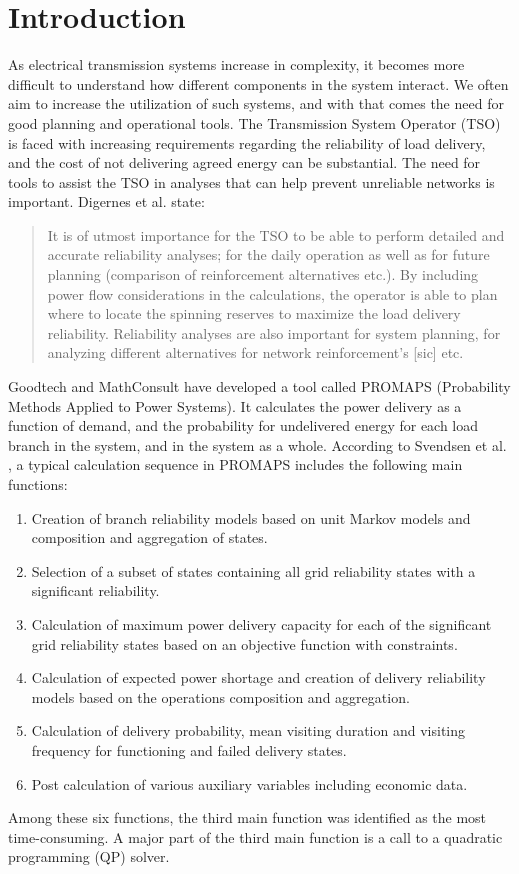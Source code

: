 \documentclass[a4paper,12pt]{report}
\begin{document}
\chapter{Introduction}
\label{ch:intro}
As electrical transmission systems increase in complexity, it becomes
more difficult to understand how different components in the system interact.
We often aim to increase the utilization of such systems, and with that comes
the need for good planning and operational tools.
The Transmission System Operator (TSO) is faced
with increasing requirements regarding the reliability of load
delivery, and the cost of not delivering agreed energy can be
substantial.
The need for tools to assist the TSO in analyses that can help prevent
unreliable networks is important.
Digernes et al. \cite{digernes} state:
\begin{quote}
It is of utmost importance for the TSO to be able to perform detailed and
accurate reliability analyses; for the daily operation as well as for
future planning (comparison of reinforcement alternatives etc.). By
including power flow considerations in the calculations, the operator is
able to plan where to locate the spinning reserves to maximize the load
delivery reliability. Reliability analyses are also important for system
planning, for analyzing different alternatives for network reinforcement's
[sic] etc.\cite{digernes}
\end{quote}

Goodtech and MathConsult have developed a tool called PROMAPS
(Probability Methods Applied to Power Systems). It calculates the power
delivery as a function of demand, and the probability for undelivered
energy for each load branch in the system, and in the system as a whole.
According to Svendsen et al. \cite{trond}, a typical calculation sequence
in PROMAPS includes the following main functions:
\begin{enumerate}
\item Creation of branch reliability models based on unit Markov models and
      composition and aggregation of states.
\item Selection of a subset of states containing all grid reliability states
      with a significant reliability.
\item Calculation of maximum power delivery capacity for each of the
      significant grid reliability states based on an objective function with
      constraints.
\item Calculation of expected power shortage and creation of delivery
      reliability models based on the operations composition and aggregation.
\item Calculation of delivery probability, mean visiting duration and visiting
      frequency for functioning and failed delivery states.
\item Post calculation of various auxiliary variables including economic data.
\end{enumerate}
Among these six functions, the third main function was identified as the most
time-consuming. A major part of the third main function is a call to a
quadratic programming (QP) solver\cite{trond}.
\end{document}
